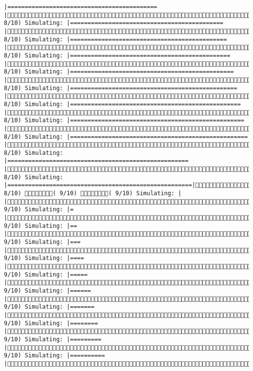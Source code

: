 \documentclass[]{article}
\begin{document}
\begin{verbatim}
|===========================================          |( 8/10) Simulating: |============================================         |( 8/10) Simulating: |=============================================        |( 8/10) Simulating: |==============================================       |( 8/10) Simulating: |===============================================      |( 8/10) Simulating: |================================================     |( 8/10) Simulating: |=================================================    |( 8/10) Simulating: |==================================================   |( 8/10) Simulating: |===================================================  |( 8/10) Simulating: |==================================================== |( 8/10) Simulating: |=====================================================|( 8/10) ( 9/10) ( 9/10) Simulating: |                                                     |( 9/10) Simulating: |=                                                    |( 9/10) Simulating: |==                                                   |( 9/10) Simulating: |===                                                  |( 9/10) Simulating: |====                                                 |( 9/10) Simulating: |=====                                                |( 9/10) Simulating: |======                                               |( 9/10) Simulating: |=======                                              |( 9/10) Simulating: |========                                             |( 9/10) Simulating: |=========                                            |( 9/10) Simulating: |==========                                           |( 
\end{verbatim}
\end{document}
